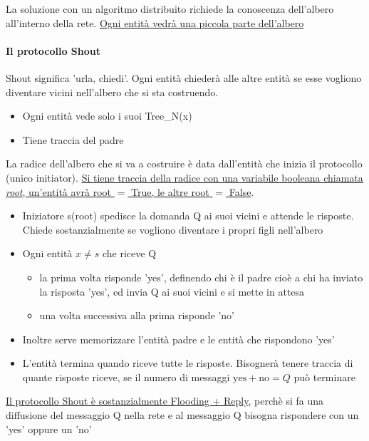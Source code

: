 La soluzione con un algoritmo distribuito richiede la conoscenza dell'albero all'interno della rete. \uline{Ogni entità vedrà una piccola parte dell'albero}

\paragraph{Il protocollo Shout}
Shout significa 'urla, chiedi'. Ogni entità chiederà alle altre entità se esse vogliono diventare vicini nell'albero che si sta costruendo.
\begin{itemize}
    \item Ogni entità vede solo i suoi Tree\_N(x)
    \item Tiene traccia del padre
\end{itemize}

La radice dell'albero che si va a costruire è data dall'entità che inizia il protocollo (unico initiator). \uline{Si tiene traccia della radice con una variabile booleana chiamata \textit{root}, un'entità avrà root $=$ True, le altre root $=$ False}.

\begin{itemize}
    \item Iniziatore s(root) spedisce la domanda Q ai suoi vicini e attende le risposte. Chiede sostanzialmente se vogliono diventare i propri figli nell'albero
    \item Ogni entità $x \neq s$ che riceve Q
    \begin{itemize}
        \item la prima volta risponde 'yes', definendo chi è il padre cioè a chi ha inviato la risposta 'yes', ed invia Q ai suoi vicini e si mette in attesa
        \item una volta successiva alla prima risponde 'no'
    \end{itemize}
    \item Inoltre serve memorizzare l'entità padre e le entità che rispondono 'yes'
    \item L'entità termina quando riceve tutte le risposte. Bisognerà tenere traccia di quante risposte riceve, se il numero di messaggi $\text{yes}+\text{no} = Q$ può terminare
\end{itemize}

\uline{Il protocollo Shout è sostanzialmente Flooding + Reply}, perchè si fa una diffusione del messaggio Q nella rete e al messaggio Q bisogna rispondere con un 'yes' oppure un 'no'

